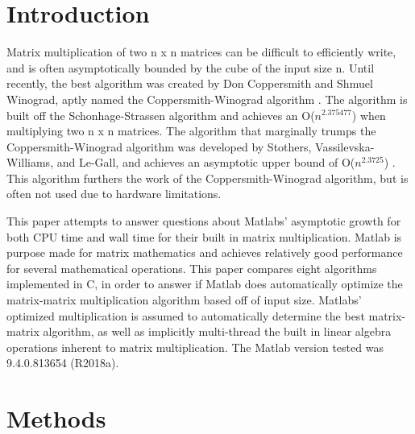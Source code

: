 \documentclass[sigconf]{acmart}
\begin{document}
%
\maketitle

\section{Introduction}

Matrix multiplication of two n x n matrices can be difficult to efficiently write, and is often asymptotically bounded by the cube of the input size n. Until recently, the best algorithm was created by Don Coppersmith and Shmuel Winograd, aptly named the Coppersmith-Winograd algorithm \cite{coppersmith-winograd}. The algorithm is built off the Schonhage-Strassen algorithm and achieves an O($n^{2.375477}$) when multiplying two n x n matrices. The algorithm that marginally trumps the Coppersmith-Winograd algorithm was developed by Stothers, Vassilevska-Williams, and Le-Gall, and achieves an asymptotic upper bound of O($n^{2.3725}$) \cite{gall}. This algorithm furthers the work of the Coppersmith-Winograd algorithm, but is often not used due to hardware limitations.

This paper attempts to answer questions about Matlabs' asymptotic growth for both CPU time and wall time for their built in matrix multiplication. Matlab is purpose made for matrix mathematics and achieves relatively good performance for several mathematical operations. This paper compares eight algorithms implemented in C, in order to answer if Matlab does automatically optimize the matrix-matrix multiplication algorithm based off of input size. Matlabs' optimized multiplication is assumed to automatically determine the best matrix-matrix algorithm, as well as implicitly multi-thread the built in linear algebra operations inherent to matrix multiplication. The Matlab version tested was 9.4.0.813654 (R2018a).

\section{Methods}
\end{document}
